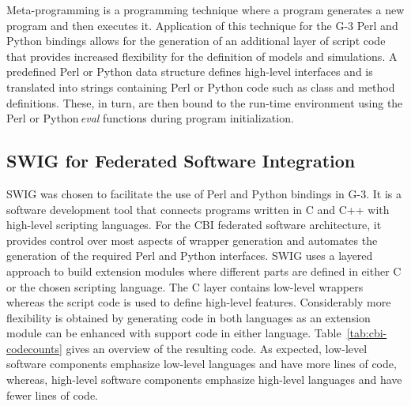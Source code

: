 \documentclass[12pt]{article}
\begin{document}
Meta-programming is a programming technique where a program generates
a new program and then executes it.  Application of this technique for
the G-3 Perl and Python bindings allows for the generation of an
additional layer of script code that provides increased flexibility
for the definition of models and simulations.  A predefined Perl or
Python data structure defines high-level interfaces and is translated
into strings containing Perl or Python code such as class and method
definitions.  These, in turn, are then bound to the run-time
environment using the Perl or Python\,{\it eval} functions during
program initialization.

\subsection{SWIG for Federated Software Integration}

SWIG was chosen to facilitate the use of Perl and Python bindings in
G-3. It is a software development tool that connects programs written
in C and C++ with high-level scripting languages. For the CBI federated software
architecture, it provides control over most aspects of wrapper
generation and automates the generation of the required Perl and
Python interfaces. SWIG uses a layered approach to build extension
modules where different parts are defined in either C or the chosen
scripting language. The C layer contains low-level wrappers whereas
the script code is used to define high-level features.  Considerably
more flexibility is obtained by generating code in both languages as
an extension module can be enhanced with support code in either
language.  Table~\ref{tab:cbi-codecounts} gives an overview of the
resulting code.  As expected, low-level software components emphasize
low-level languages and have more lines of code, whereas, high-level
software components emphasize high-level languages and have fewer
lines of code.
\end{document}
